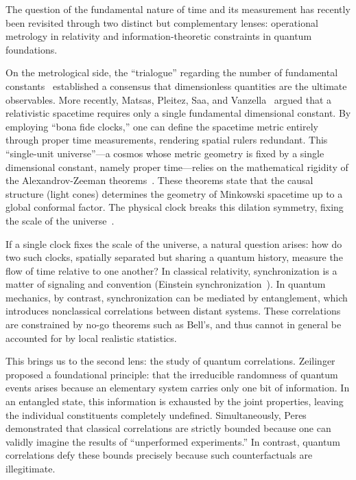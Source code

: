 \documentclass[reprint,aps,pra,longbibliography]{revtex4-2}
\begin{document}
The question of the fundamental nature of time and its measurement has recently been revisited through two distinct but complementary lenses: operational metrology in relativity and information-theoretic constraints in quantum foundations.

On the metrological side, the ``trialogue'' regarding the number of fundamental constants~\cite{DuffOkunVeneziano} established a consensus that dimensionless quantities are the ultimate observables. More recently, Matsas, Pleitez, Saa, and Vanzella~\cite{matsas-2024} argued that a relativistic spacetime requires only a single fundamental dimensional constant. By employing ``bona fide clocks,'' one can define the spacetime metric entirely through proper time measurements, rendering spatial rulers redundant.
This ``single-unit universe''---a cosmos whose metric geometry is fixed by
a single dimensional constant, namely proper time---relies on the mathematical rigidity of the Alexandrov-Zeeman theorems~\cite{alex3,zeeman}. These theorems state that the causal structure (light cones) determines the geometry of Minkowski spacetime up to a global conformal factor. The physical clock breaks this dilation symmetry, fixing the scale of the universe~\cite{svozil-2025-lt}.

If a single clock fixes the scale of the universe, a natural question arises: how do two such clocks, spatially separated but sharing a quantum history, measure the flow of time relative to one another? In classical relativity, synchronization is a matter of signaling and convention (Einstein synchronization~\cite{ein-05}). In quantum mechanics, by contrast, synchronization can be mediated by entanglement, which introduces nonclassical correlations between distant systems. These correlations are constrained by no-go theorems such as Bell's, and thus cannot in general be accounted for by local realistic statistics.

This brings us to the second lens: the study of quantum correlations. Zeilinger~\cite{zeil-99} proposed a foundational principle: that the irreducible randomness of quantum events arises because an elementary system carries only one bit of information. In an entangled state, this information is exhausted by the joint properties, leaving the individual constituents completely undefined. Simultaneously, Peres~\cite{peres222} demonstrated that classical correlations are strictly bounded because one can validly imagine the results of ``unperformed experiments.'' In contrast, quantum correlations defy these bounds precisely because such counterfactuals are illegitimate.
\end{document}
